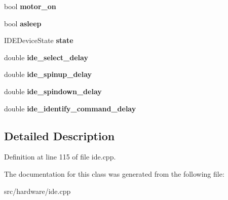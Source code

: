 \begin{DoxyCompactItemize}
\item 
\hypertarget{classIDEDevice_a89769c3383a7fc337a9c90f74d68b3d9}{bool {\bfseries motor\-\_\-on}}\label{classIDEDevice_a89769c3383a7fc337a9c90f74d68b3d9}

\item 
\hypertarget{classIDEDevice_a426ded1b443ad557e17936a460672383}{bool {\bfseries asleep}}\label{classIDEDevice_a426ded1b443ad557e17936a460672383}

\item 
\hypertarget{classIDEDevice_a36a20a48ec09fbbb26444ee4af9113b8}{I\-D\-E\-Device\-State {\bfseries state}}\label{classIDEDevice_a36a20a48ec09fbbb26444ee4af9113b8}

\item 
\hypertarget{classIDEDevice_aae577afca50523abdbf8aacc7317335d}{double {\bfseries ide\-\_\-select\-\_\-delay}}\label{classIDEDevice_aae577afca50523abdbf8aacc7317335d}

\item 
\hypertarget{classIDEDevice_aca59bb2197b37cf31821ca98e6cd1ed8}{double {\bfseries ide\-\_\-spinup\-\_\-delay}}\label{classIDEDevice_aca59bb2197b37cf31821ca98e6cd1ed8}

\item 
\hypertarget{classIDEDevice_ac1d7d6ca00bff8d765f0db43ad26297b}{double {\bfseries ide\-\_\-spindown\-\_\-delay}}\label{classIDEDevice_ac1d7d6ca00bff8d765f0db43ad26297b}

\item 
\hypertarget{classIDEDevice_aadf3fd25ff624d301e8a0ed6b92fc2c7}{double {\bfseries ide\-\_\-identify\-\_\-command\-\_\-delay}}\label{classIDEDevice_aadf3fd25ff624d301e8a0ed6b92fc2c7}

\end{DoxyCompactItemize}


\subsection{Detailed Description}


Definition at line 115 of file ide.\-cpp.



The documentation for this class was generated from the following file\-:\begin{DoxyCompactItemize}
\item 
src/hardware/ide.\-cpp\end{DoxyCompactItemize}
